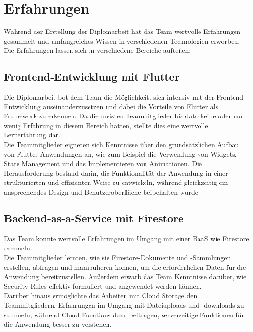 \section{Erfahrungen}

Während der Erstellung der Diplomarbeit hat das Team wertvolle Erfahrungen gesammelt und umfangreiches Wissen in verschiedenen Technologien erworben. Die Erfahrungen lassen sich in verschiedene Bereiche aufteilen:

\subsection{Frontend-Entwicklung mit Flutter}

Die Diplomarbeit bot dem Team die Möglichkeit, sich intensiv mit der Frontend-Entwicklung auseinanderzusetzen und dabei die Vorteile von Flutter als Framework zu erkennen. Da die meisten Teammitglieder bis dato keine oder nur wenig Erfahrung in diesem Bereich hatten, stellte dies eine wertvolle Lernerfahrung dar.
\\
Die Teammitglieder eigneten sich Kenntnisse über den grundsätzlichen Aufbau von Flutter-Anwendungen an, wie zum Beispiel die Verwendung von Widgets, State Management und das Implementieren von Animationen. Die Herausforderung bestand darin, die Funktionalität der Anwendung in einer strukturierten und effizienten Weise zu entwickeln, während gleichzeitig ein ansprechendes Design und Benutzeroberfläche beibehalten wurde.

\subsection{Backend-as-a-Service mit Firestore}

Das Team konnte wertvolle Erfahrungen im Umgang mit einer BaaS wie Firestore sammeln.
\\
Die Teammitglieder lernten, wie sie Firestore-Dokumente und -Sammlungen erstellen, abfragen und manipulieren können, um die erforderlichen Daten für die Anwendung bereitzustellen. Außerdem erwarb das Team Kenntnisse darüber, wie Security Rules effektiv formuliert und angewendet werden können.
\\
Darüber hinaus ermöglichte das Arbeiten mit Cloud Storage den Teammitgliedern, Erfahrungen im Umgang mit Dateiuploads und -downloads zu sammeln, während Cloud Functions dazu beitrugen, serverseitige Funktionen für die Anwendung besser zu verstehen.

